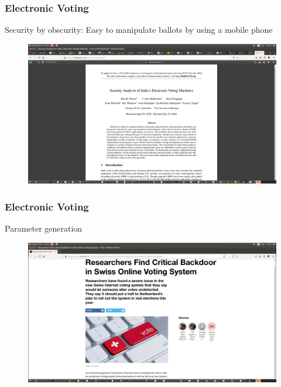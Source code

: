 \documentclass{beamer}
\begin{document}
\begin{frame}
\frametitle{Electronic Voting}
{Security by obscurity: Easy to manipulate ballots by using a mobile phone}
\begin{figure}
\includegraphics[scale=0.20]{Indiavote.png}
\end{figure}
\end{frame}


\begin{frame}
\frametitle{Electronic Voting}
{Parameter generation}
\begin{figure}
\includegraphics[scale=0.20]{swisspost.png}
\end{figure}
\end{frame}
\end{document}
